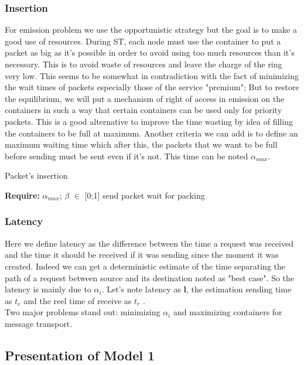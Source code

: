 \documentclass{article}
\begin{document}
\subsubsection{Insertion} 
For emission problem we use the opportunistic strategy but the goal is to make a good use of resources. During ST, each node must use the container to put a packet as big as it's possible in order to avoid using too much resources than it's necessary. This is to avoid waste of resources and leave the charge of the ring very low. This seems to be somewhat in contradiction with the fact of minimizing the wait times of packets especially those of the service "premium"; But to restore the equilibrium, we will put a mechanism of right of access in emission on the containers in such a way that certain containers can be used only for priority packets. This is a good alternative to improve the time wasting by idea of filling the containers to be full at maximum. Another criteria we can add is to define an maximum waiting time which after this, the packets that we want to be full before sending must be sent even if it's not. This time can be noted \textbf{ {$\alpha_{max}$}}.

\begin{algorithm}
\caption{Packet's insertion}
\begin{algorithmic}
\State \textbf{Require:}  $\alpha_{max}$; $\beta$ $\in$ [0;1]
\State send packet
\Else
\State wait for packing 
\EndIf
\end{algorithmic}
\end{algorithm}  
\newpage
\subsubsection{Latency}
Here we define latency as the difference between the time a request was received and the time it should be received if it was sending since the moment it was created. Indeed we can get a deterministic estimate of the time separating the path of a request between source and its destination noted as "best case". So the latency is mainly due to {$\alpha_{i}$}. Let's note latency as  \textbf{l}, the estimation sending time as  \textbf{ {$t_{e}$} } and the reel time of receive as { {$t_{r}$} } .\\

Two major problems stand out: minimizing {$\alpha_{i}$} and maximizing containers for message transport.
\subsection{Presentation of Model 1}
\end{document}
